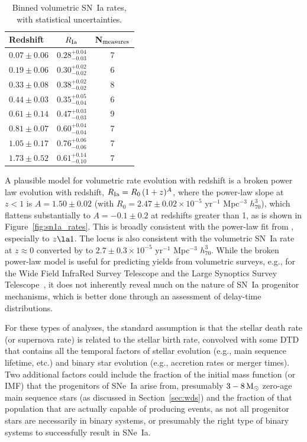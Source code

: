 \documentclass[apj]{aastex62}
\begin{document}
\begin{table}[h]
   \centering
   \caption{Binned volumetric SN~Ia rates, with statistical uncertainties.}
   \begin{tabular}{lcc} 
   \hline
   \hline
   Redshift & $R_{\rm Ia}$\tablenotemark{a}&N$_{\rm measures}$\\
   \hline
$0.07 \pm{0.06}$ & $0.28^{+0.04}_{-0.03}$& 7\\
$0.19 \pm{0.06}$ & $0.30^{+0.02}_{-0.02}$& 6\\
$0.33 \pm{0.08}$ & $0.38^{+0.02}_{-0.02}$& 8\\
$0.44 \pm{0.03}$ & $0.35^{+0.05}_{-0.04}$& 6\\
$0.61 \pm{0.14}$ & $0.47^{+0.03}_{-0.03}$& 9\\
$0.81 \pm{0.07}$ & $0.60^{+0.04}_{-0.04}$& 7\\
$1.05 \pm{0.17}$ & $0.76^{+0.06}_{-0.06}$& 7\\
$1.73 \pm{0.52}$ & $0.61^{+0.14}_{-0.10}$& 7\\
\hline
   \end{tabular}
   \label{tab:sn1a_bin}
\end{table}

A plausible model for volumetric rate evolution with redshift is a broken power law evolution with redshift, $R_{\rm Ia}=R_0\,(1+z)^A$, where  the power-law slope at $z<1$ is $A=1.50\pm0.02$ (with $R_0 = 2.47\pm0.02\times10^{-5}$ yr$^{-1}$ Mpc$^{-3}$ $h_{70}^3$), which flattens substantially to $A=-0.1\pm0.2$ at redshifts greater than 1, as is shown in  Figure~\ref{fig:sn1a_rates}. This is broadly consistent with the power-law fit from \cite{Okumura:2014}, especially to $z\la1$. The locus is also consistent with the volumetric SN~Ia rate at $z\approx0$ converted by \cite{Li:2011b} to $2.7\pm0.3\times10^{-5}$ yr$^{-1}$ Mpc$^{-3}$ $h_{70}^3$. While the broken power-law model is useful for predicting yields from volumetric surveys, e.g., for the Wide Field InfraRed Survey Telescope \cite[\textit{WFIRST, }][]{Hounsell:2018fv} and the Large Synoptics Survey Telescope~\cite[\textit{LSST, }][]{Kessler:2019fr}, it does not inherently reveal much on the nature of SN~Ia progenitor mechanisms, which is better done through an assessment of delay-time distributions.

For these types of analyses, the standard assumption is that the stellar death rate (or supernova rate) is related to the stellar birth rate, convolved with some DTD that contains all the temporal factors of stellar evolution (e.g., main sequence lifetime, etc.) and binary star evolution (e.g., accretion rates or merger times). Two additional factors could include the fraction of the initial mass function (or IMF) that the progenitors of SNe~Ia arise from, presumably $3 - 8\, \rm{M}_{\odot}$ zero-age main sequence stars (as discussed in Section~\ref{sec:wds}) and the fraction of that population that are actually capable of producing events, as not all progenitor stars are necessarily in binary systems, or presumably the right type of binary systems to successfully result in SNe~Ia.
\end{document}
